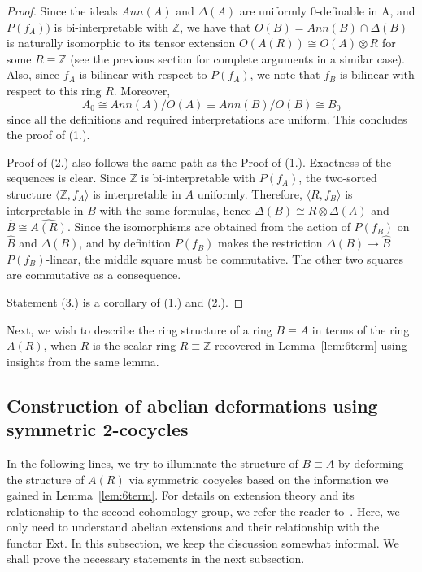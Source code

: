\documentclass{article}
\theoremstyle{remark}
\def\Z{{\mathbb{Z}}}
\def\Ext{\text{Ext}}
\begin{document}
\begin{proof}
  Since the ideals $Ann(A)$ and $\Delta(A)$ are uniformly 0-definable in A, and $P(f_A))$ is bi-interpretable with $\Z$, we have that $O(B)=Ann(B)\cap \Delta(B)$ is naturally isomorphic to its tensor extension $O(A(R))\cong O(A)\otimes R$ for some $R\equiv \Z$ (see the previous section for complete arguments in a similar case). Also, since $f_A$ is bilinear with respect to $P(f_A)$, we note that $f_B$ is bilinear with respect to this ring $R$. Moreover, $$A_0\cong Ann(A)/O(A)\equiv Ann(B)/O(B)\cong B_0$$  since all the definitions and required interpretations are uniform. This concludes the proof of (1.).

Proof of (2.) also follows the same path as the Proof of (1.). Exactness of the sequences is clear. Since $\Z$ is bi-interpretable with $P(f_A)$, the two-sorted structure $\langle \Z, f_A\rangle$ is interpretable in $A$ uniformly. Therefore, $\langle R, f_B\rangle$ is interpretable in $B$ with the same formulas, hence $\Delta(B)\cong R\otimes \Delta(A)$ and $\widehat{B}\cong \widehat{A(R)}$. Since the isomorphisms are obtained from the action of $P(f_B)$ on $\widehat{B}$ and $\Delta(B)$, and by definition $P(f_B)$ makes the restriction $\Delta(B) \to \widehat{B}$ $P(f_B)$-linear, the middle square must be commutative. The other two squares are commutative as a consequence.

Statement (3.) is a corollary of (1.) and (2.).


  
\end{proof}

Next, we wish to describe the ring structure of a ring $B\equiv A$ in terms of the ring $A(R)$, when $R$ is the scalar ring $R\equiv \Z$ recovered in Lemma~\ref{lem:6term} using insights from the same lemma.


\subsection{Construction of abelian deformations using symmetric 2-cocycles} \label{subsec:cocycles}
In the following lines, we try to illuminate the structure of $B\equiv A$ by deforming the structure of $A(R)$ via symmetric cocycles based on the information we gained in Lemma~\ref{lem:6term}. For details on extension theory and its relationship to the second cohomology group, we refer the reader to~\cite{robin}. Here, we only need to understand abelian extensions and their relationship with the functor $\Ext$. In this subsection, we keep the discussion somewhat informal. We shall prove the necessary statements in the next subsection.
\end{document}

